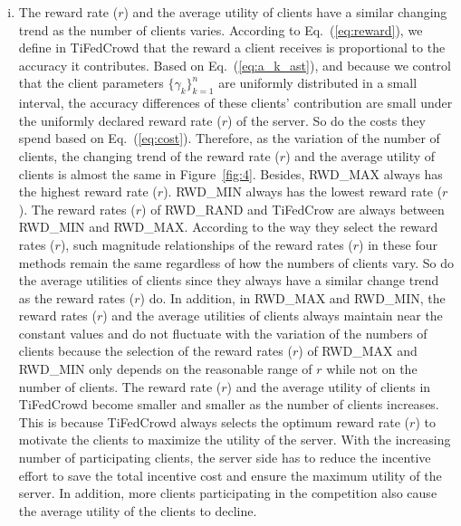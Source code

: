 \documentclass[final,1p,times]{elsarticle}
\begin{document}
\begin{enumerate}[(i)]
	\item The reward rate ($r$) and the average utility of clients have a similar changing trend as the number of clients varies. According to Eq.~(\ref{eq:reward}), we define in TiFedCrowd that the reward a client receives is proportional to the accuracy it contributes. Based on Eq.~(\ref{eq:a_k_ast}), and because we control that the client parameters $\{\gamma_k\}_{k=1}^n$ are uniformly distributed in a small interval, the accuracy differences of these clients' contribution are small under the uniformly declared reward rate ($r$) of the server. So do the costs they spend based on Eq.~(\ref{eq:cost}). Therefore, as the variation of the number of clients, the changing trend of the reward rate ($r$) and the average utility of clients is almost the same in Figure~\ref{fig:4}. Besides, RWD\_MAX always has the highest reward rate ($r$). RWD\_MIN always has the lowest reward rate ($r$). The reward rates ($r$) of RWD\_RAND and TiFedCrow are always between RWD\_MIN and RWD\_MAX. According to the way they select the reward rates ($r$), such magnitude relationships of the reward rates ($r$) in these four methods remain the same regardless of how the numbers of clients vary. So do the average utilities of clients since they always have a similar change trend as the reward rates ($r$) do. In addition, in RWD\_MAX and RWD\_MIN, the reward rates ($r$) and the average utilities of clients always maintain near the constant values and do not fluctuate with the variation of the numbers of clients because the selection of the reward rates ($r$) of RWD\_MAX and RWD\_MIN only depends on the reasonable range of $r$ while not on the number of clients. The reward rate ($r$) and the average utility of clients in TiFedCrowd become smaller and smaller as the number of clients increases. This is because TiFedCrowd always selects the optimum reward rate ($r$) to motivate the clients to maximize the utility of the server. With the increasing number of participating clients, the server side has to reduce the incentive effort to save the total incentive cost and ensure the maximum utility of the server. In addition, more clients participating in the competition also cause the average utility of the clients to decline.

\end{enumerate}
\end{document}
